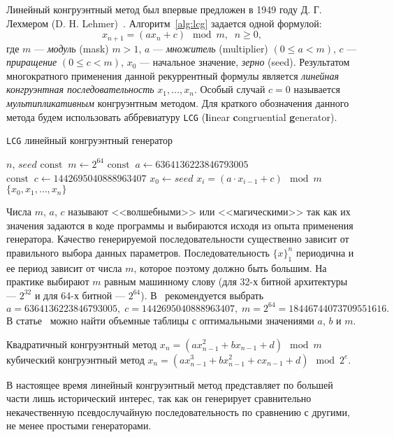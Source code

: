 \documentclass[%
floatfix,
showkeys,
nofootinbib, %
superscriptaddress, %
]{revtex4-1}
\newcommand{\const}{\mathrm{const}}
\begin{document}
Линейный конгруэнтный метод был впервые предложен в 1949 году
Д. Г. Лехмером (D. H. Lehmer)~\cite{L_DKnuth:2004:ru}. Алгоритм~\ref{alg:lcg} задается одной формулой:
\[
x_{n+1} = (a x_{n} + c) \mod m,\;\; n \geqslant 0,
\]
где $m$ --- \emph{модуль} (mask) $m > 1$, $a$ --- \emph{множитель}
(multiplier) $(0 \leqslant a < m)$, $c$ --- \emph{приращение}
$(0 \leqslant c < m)$, $x_0$ --- начальное значение, \emph{зерно}
(seed). Результатом многократного применения данной рекуррентный
формулы является \emph{линейная конгруэнтная последовательность}
$x_{1},\ldots,x_{n}$. Особый случай $c=0$ называется
\emph{мультипликативным} конгруэнтным методом. Для краткого
обозначения данного метода будем использовать аббревиатуру
\texttt{LCG} (\textbf{l}inear \textbf{c}ongruential
\textbf{g}enerator).

\begin{algorithm}[H]
  \caption{\texttt{LCG} линейный конгруэнтный
    генератор}\label{alg:lcg}
  \begin{algorithmic}
    \Require $n$, $seed$ \State $\const\;\;m \leftarrow 2^{64}$ \State
    $\const\;\;a \leftarrow 6364136223846793005$ \State
    $\const\;\;c \leftarrow 1442695040888963407$ \State
    $x_{0} \leftarrow seed$  \State
    $x_{i} = (a \cdot x_{i-1} + c) \mod m$
    \EndFor
    \State \Return $\{x_{0}, x_{1}, \ldots, x_{n}\}$
  \end{algorithmic}
\end{algorithm}

Числа $m$, $a$, $c$ называют <<волшебными>> или <<магическими>> так
как их значения задаются в коде программы и выбираются исходя из опыта
применения генератора. Качество генерируемой последовательности
существенно зависит от правильного выбора данных
параметров. Последовательность $\{x\}^{n}_{1}$ периодична и ее период
зависит от числа $m$, которое поэтому должно быть большим. На практике
выбирают $m$ равным машинному слову (для 32-х битной архитектуры —
$2^{32}$ и для 64-х битной --- $2^{64}$). В~\cite{L_DKnuth:2004:ru} рекомендуется выбрать
\[
a=6364136223846793005,\; c=1442695040888963407,\; m=2^{64} =
18446744073709551616.
\]
В статье~\cite{L_Ecuyer:1999} можно найти объемные таблицы с
оптимальными значениями $a$, $b$ и $m$.

Квадратичный конгруэнтный метод
$x_{n} = ( a x_{n-1}^2 + b x_{n-1} + d ) \mod m$ кубический
конгруэнтный метод
$x_{n} = ( a x_{n-1}^3 + b x_{n-1}^2 + c x_{n-1} + d )\mod 2^e$.

В настоящее время линейный конгруэнтный метод представляет по большей
части лишь исторический интерес, так как он генерирует сравнительно
некачественную псевдослучайную последовательность по сравнению с
другими, не менее простыми генераторами.
\end{document}
